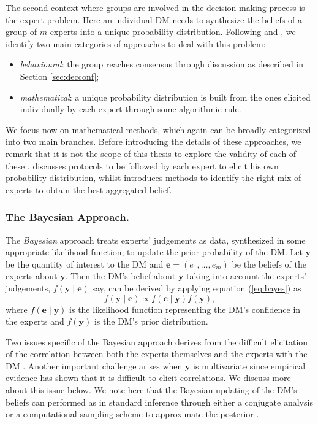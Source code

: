 The second context where groups are involved in the decision making process is the expert problem. Here an individual \gls{DM} needs to synthesize the beliefs of a group of $m$ experts into a unique probability distribution. Following \citet{Clemen99} and \citet{French2011}, we identify  two main categories of approaches to deal with this problem:
\begin{itemize}
\item \textit{behavioural}: the group reaches consensus through discussion as described in Section \ref{sec:decconf};
\item \textit{mathematical}: a unique probability distribution is built from the ones elicited individually by each expert through some algorithmic rule. 
\end{itemize}
We focus now on mathematical methods, which again can be broadly categorized into two main branches. Before introducing the details of these approaches, we remark that it is not the scope of this thesis to explore the validity of each of these \citep[see e.g.][and the references therein for an extensive discussion]{Clemen99,French2011}. \citet{O'Hagan2006a} discusses  protocols to be followed by each expert to elicit his own probability distribution, whilst \citet{Merrick2008} introduces methods to identify the right mix of experts to obtain the best aggregated belief.

\subsubsection{The Bayesian Approach.}
The \textit{Bayesian} approach treats experts' judgements as data, synthesized in some appropriate likelihood function, to update the prior probability of the \gls{DM}. Let $\bm{y}$ be the quantity of interest to the \gls{DM} and $\bm{e}=(e_1,\dots,e_m)$ be the beliefs of the experts about $\bm{y}$. Then the \gls{DM}'s belief about $\bm{y}$ taking into account the experts' judgements, $f(\bm{y}\;|\; \bm{e})$ say, can be derived by applying equation (\ref{eq:bayes}) as
\begin{equation*}
\label{eq:bayesianaggregation}
f(\bm{y}\;|\; \bm{e})\propto f(\bm{e}\;|\; \bm{y})f(\bm{y}),
\end{equation*}
where $ f(\bm{e}\;|\; \bm{y})$ is the likelihood function representing the \gls{DM}'s confidence in the experts and $f(\bm{y})$ is the \gls{DM}'s prior distribution.

Two issues specific of the Bayesian approach derives from the difficult elicitation of the correlation between both the experts themselves and the experts with the \gls{DM} \citep{French1980, Mumpower1996}. Another important challenge arises when $\bm{y}$ is multivariate since empirical evidence has shown that it is difficult to elicit correlations. We discuss more about this issue below. We note here that the Bayesian updating of the \gls{DM}'s beliefs can performed as in standard inference through either a conjugate analysis \citep[see e.g.][]{Wiper1995c} or a computational sampling scheme to approximate the posterior \citep[see e.g.][]{Albert2012} .

